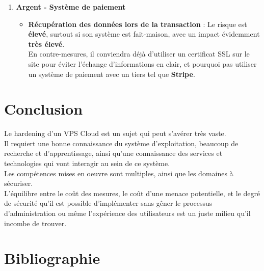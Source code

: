 \documentclass[a4paper,10pt,final,fleqn]{article}
\begin{document}
\begin{enumerate}
					\item \textbf{Argent - Système de paiement}

						\begin{itemize}
							\item \textbf{Récupération des données lors de la transaction} : Le risque est \textbf{élevé}, surtout si son système est fait-maison, avec un impact évidemment \textbf{très élevé}.\\
							En contre-mesures, il conviendra déjà d'utiliser un certificat SSL sur le site pour éviter l'échange d'informations en clair, et pourquoi pas utiliser un système de paiement avec un tiers tel que \textbf{Stripe}.\\
						\end{itemize}
						
				\end{enumerate}

		\section{Conclusion}

			Le hardening d'un VPS Cloud est un sujet qui peut s'avérer très vaste.\\
			Il requiert une bonne connaissance du système d'exploitation, beaucoup de recherche et d'apprentissage, ainsi qu'une connaissance des services et technologies qui vont interagir au sein de ce système.\\
			Les compétences mises en oeuvre sont multiples, ainsi que les domaines à sécuriser.\\

			L'équilibre entre le coût des mesures, le coût d'une menace potentielle, et le degré de sécurité qu'il est possible d'implémenter sans gêner le processus d'administration ou même l'expérience des utilisateurs est un juste milieu qu'il incombe de trouver.\\

		\section{Bibliographie}
\end{document}
